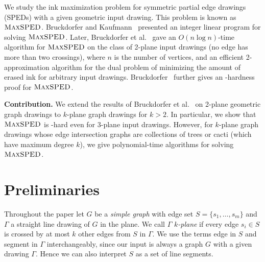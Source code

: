 \documentclass[a4paper,english,numberwithinsect]{eurocg18}
\newcommand{\maxsped}{\ensuremath{\textsc{MaxSPED}}\xspace}
\begin{document}
We study the ink maximization problem for symmetric partial edge drawings (SPEDs) with a given geometric input drawing.
This problem is known as \maxsped. 
Bruckdorfer and Kaufmann~\cite{bk-ecbe-12} presented an integer linear program for solving \maxsped. 
Later, Bruckdorfer et al.~\cite{bcgkmn-pped-17} gave an $O(n \log n)$-time algorithm for \maxsped on the class of 2-plane input drawings (no edge has more than two crossings), where $n$ is the number of vertices, and an efficient 2-approximation algorithm for the dual problem of minimizing the amount of erased ink for arbitrary input drawings.
Bruckdorfer~\cite{b-sgh-15} further gives an \NP-hardness proof for \maxsped.

\medskip

\noindent\textbf{Contribution.} We extend the results of Bruckdorfer et al.~\cite{bcgkmn-pped-17} on 2-plane geometric graph drawings to $k$-plane graph drawings for $k > 2$. 
In particular, we show that \maxsped is \NP-hard even for 3-plane input drawings. 
However, for $k$-plane graph drawings whose edge intersection graphs are collections of trees or cacti (which have maximum degree $k$), we give polynomial-time algorithms for solving \maxsped.





\section{Preliminaries}\label{sec:preliminaries}

Throughout the paper let $ G $ be a \emph{simple graph} with edge set $ S = \{s_1,\dots,s_m\}$ and $ \Gamma $ a straight line drawing of $ G $ in the plane. We call $ \Gamma $ \emph{$ k $-plane} if every edge $ s_i \in S $ is crossed by at most $ k $ other edges from $ S $ in $ \Gamma $. We use the terms edge in $ S $ and segment in $ \Gamma $ interchangeably, since our input is always a graph $G$ with a given drawing $ \Gamma $. Hence we can also interpret $S$ as a set of line segments.
\end{document}
